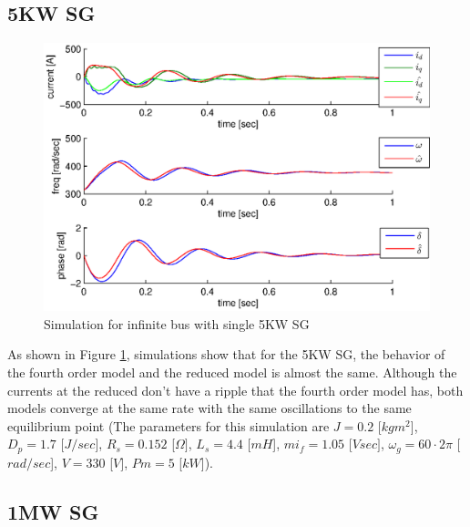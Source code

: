 \documentclass[conference]{IEEEtran}
\begin{document}
\subsection{5KW SG}

\begin{figure}[h]
\includegraphics[scale=0.5]{sim5KWInfBus}

\caption{Simulation for infinite bus with single 5KW SG}
\label{fig:InfBusOne5KWSG}
\end{figure}

As shown in Figure \ref{fig:InfBusOne5KWSG}, simulations show that
for the 5KW SG, the behavior of the fourth order model and the reduced
model is almost the same. Although the currents at the reduced don't
have a ripple that the fourth order model has, both models converge
at the same rate with the same oscillations to the same equilibrium
point (The parameters for this simulation are $J=0.2$ {[}$kgm^{2}${]},
$D_{p}=1.7$ {[}$J/sec${]}, $R_{s}=0.152$ {[}$\Omega]$, $L_{s}=4.4$
{[}$mH${]}, $mi_{f}=1.05$ {[}$Vsec]$, $\omega_{g}=60\cdotp2\pi$
{[}$rad/sec${]}, $V=330$ {[}$V]$, $Pm=5$ {[}$kW${]}). 

\subsection{1MW SG}
\end{document}
